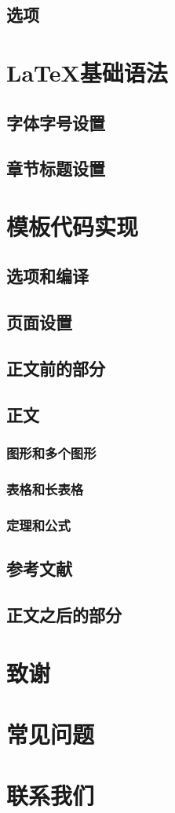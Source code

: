 \documentclass[bachelor,openright]{buaathesis}
\begin{document}
	\section{选项}
\chapter{LaTeX{}基础语法}
	\section{字体字号设置}
	\section{章节标题设置}
\chapter{模板代码实现}
	\section{选项和编译}
	\section{页面设置}
	\section{正文前的部分}
	\section{正文}
		\subsection{图形和多个图形}
		\subsection{表格和长表格}
		\subsection{定理和公式}
	\section{参考文献}
	\section{正文之后的部分}
\chapter{致谢}
\cleardoublepage
%

\appendix


\chapter{常见问题}
\chapter{联系我们}
\end{document}
